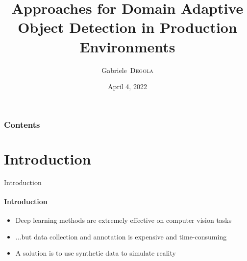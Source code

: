 \documentclass[aspectratio=141]{beamer}
\title[Approaches for Domain Adaptive Object Detection in Production Environments]{Approaches for Domain Adaptive Object Detection in Production Environments}
\date[04/04/2022]{April 4, 2022}
\author[G. Degola]{Gabriele~\textsc{Degola}}
\newcommand\pro{\item[\faThumbsOUp]}
\newcommand\con{\item[\faThumbsODown]}
\begin{document}
\begin{frame}
\titlepage
\end{frame}

\begin{frame}
    \frametitle{Contents}
    \tableofcontents
\end{frame}

\section{Introduction}

\begin{frame}{Introduction}
    \framesubtitle{Introduction}
    
    \begin{overlayarea}{\textwidth}{6cm}
    \begin{itemize}
        \pro<1-> \alert{Deep learning} methods are extremely effective on \alert{computer vision} tasks
        \con<2-> ...but data collection and annotation is expensive and time-consuming
        \vspace*{3mm}
        \pro<3-> A solution is to use \alert{synthetic} data to simulate \alert{reality}
\end{itemize}
\end{overlayarea}
\end{frame}
\end{document}
